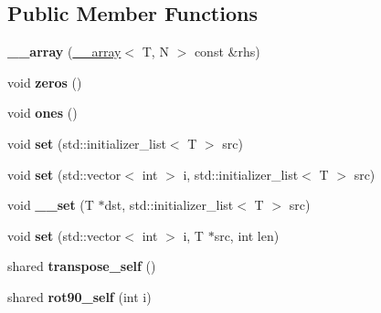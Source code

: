 \subsection*{Public Member Functions}
\begin{DoxyCompactItemize}
\item 
\hypertarget{class____array_ac3443fee161fd3f8ccb1290980a4190d}{
{\bfseries \_\-\_\-array} (\hyperlink{class____array}{\_\-\_\-array}$<$ T, N $>$ const \&rhs)}
\label{class____array_ac3443fee161fd3f8ccb1290980a4190d}

\item 
\hypertarget{class____array_a1072f5c538102121515000a4ef521303}{
void {\bfseries zeros} ()}
\label{class____array_a1072f5c538102121515000a4ef521303}

\item 
\hypertarget{class____array_ad1fd7d5c46fb341f54cab916b78be561}{
void {\bfseries ones} ()}
\label{class____array_ad1fd7d5c46fb341f54cab916b78be561}

\item 
\hypertarget{class____array_ae6a7f942aeb5857504e9db83f7cfac57}{
void {\bfseries set} (std::initializer\_\-list$<$ T $>$ src)}
\label{class____array_ae6a7f942aeb5857504e9db83f7cfac57}

\item 
\hypertarget{class____array_a483485b393733908c01c2cb2e74d08e0}{
void {\bfseries set} (std::vector$<$ int $>$ i, std::initializer\_\-list$<$ T $>$ src)}
\label{class____array_a483485b393733908c01c2cb2e74d08e0}

\item 
\hypertarget{class____array_af9523af4f7911a07f54d8fce750e3332}{
void {\bfseries \_\-\_\-set} (T $\ast$dst, std::initializer\_\-list$<$ T $>$ src)}
\label{class____array_af9523af4f7911a07f54d8fce750e3332}

\item 
\hypertarget{class____array_a272fe82c6f31832970e123ac4ca66b08}{
void {\bfseries set} (std::vector$<$ int $>$ i, T $\ast$src, int len)}
\label{class____array_a272fe82c6f31832970e123ac4ca66b08}

\item 
\hypertarget{class____array_ac1c5c3051c03e39b9715903ee0fb202d}{
shared {\bfseries transpose\_\-self} ()}
\label{class____array_ac1c5c3051c03e39b9715903ee0fb202d}

\item 
\hypertarget{class____array_a0f127aa40d72c1087c538619e5cd6ef9}{
shared {\bfseries rot90\_\-self} (int i)}
\label{class____array_a0f127aa40d72c1087c538619e5cd6ef9}


\end{DoxyCompactItemize}
